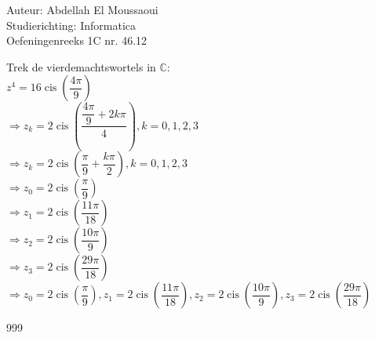 \documentclass[a4paper]{article}
\begin{document}
  
\noindent \large Auteur: Abdellah El Moussaoui\\
\noindent \large Studierichting: Informatica\\
\noindent \large Oefeningenreeks 1C nr. 46.12\\

\medskip

\normalsize

\medskip

Trek de vierdemachtswortels in $\mathbb{C}$:\\

$z^4=16\operatorname{cis}\left(\dfrac{4\pi}{9}\right)$\\

$\Rightarrow z_k=2\operatorname{cis}\left(\dfrac{\dfrac{4\pi}{9}+2k\pi}{4}\right),k=0,1,2,3$\\

$\Rightarrow z_k=2\operatorname{cis}\left(\dfrac{\pi}{9}+\dfrac{k\pi}{2}\right),k=0,1,2,3$\\

$\Rightarrow z_0=2\operatorname{cis}\left(\dfrac{\pi}{9}\right)$\\

$\Rightarrow z_1=2\operatorname{cis}\left(\dfrac{11\pi}{18}\right)$\\

$\Rightarrow z_2=2\operatorname{cis}\left(\dfrac{10\pi}{9}\right)$\\

$\Rightarrow z_3=2\operatorname{cis}\left(\dfrac{29\pi}{18}\right)$\\

$\Rightarrow \boxed{z_0=2\operatorname{cis}\left(\dfrac{\pi}{9}\right),z_1=2\operatorname{cis}\left(\dfrac{11\pi}{18}\right),z_2=2\operatorname{cis}\left(\dfrac{10\pi}{9}\right),z_3=2\operatorname{cis}\left(\dfrac{29\pi}{18}\right)}$\\


\begin{thebibliography}{999}
\end{thebibliography}
\end{document}
